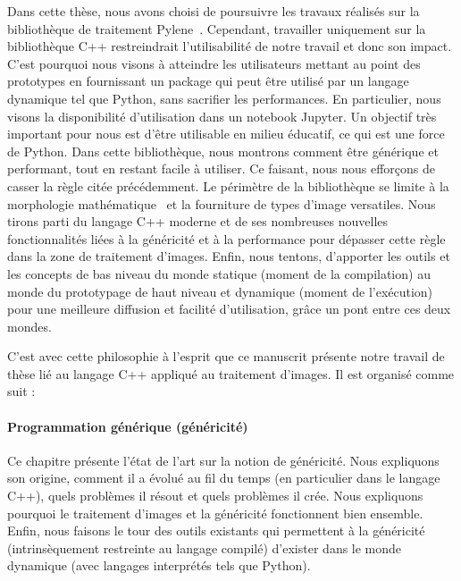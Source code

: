 Dans cette thèse, nous avons choisi de poursuivre les travaux réalisés sur la bibliothèque de traitement
Pylene~\parencite{carlinet.2018.pylena}. Cependant, travailler uniquement sur la bibliothèque C++ restreindrait
l'utilisabilité de notre travail et donc son impact. C'est pourquoi nous visons à atteindre les utilisateurs mettant au
point des prototypes en fournissant un package qui peut être utilisé par un langage dynamique tel que Python, sans
sacrifier les performances. En particulier, nous visons la disponibilité d'utilisation dans un notebook Jupyter. Un
objectif très important pour nous est d'être utilisable en milieu éducatif, ce qui est une force de Python. Dans cette
bibliothèque, nous montrons comment être générique et performant, tout en restant facile à utiliser. Ce faisant, nous
nous efforçons de casser la règle citée précédemment. Le périmètre de la bibliothèque se limite à la morphologie
mathématique~\parencite{najman.2013.mathematical,geraud.2010.book} et la fourniture de types d'image versatiles. Nous
tirons parti du langage C++ moderne et de ses nombreuses nouvelles fonctionnalités liées à la généricité et à la
performance pour dépasser cette règle dans la zone de traitement d'images. Enfin, nous tentons, d'apporter les outils et
les concepts de bas niveau du monde statique (moment de la compilation) au monde du prototypage de haut niveau et
dynamique (moment de l'exécution) pour une meilleure diffusion et facilité d'utilisation, grâce un pont entre ces deux
mondes.

C'est avec cette philosophie à l'esprit que ce manuscrit présente notre travail de thèse lié au langage C++ appliqué au
traitement d'images. Il est organisé comme suit :

\paragraph{Programmation générique (généricité)} Ce chapitre présente l'état de l'art sur la notion de généricité. Nous
expliquons son origine, comment il a évolué au fil du temps (en particulier dans le langage C++), quels problèmes il
résout et quels problèmes il crée. Nous expliquons pourquoi le traitement d'images et la généricité fonctionnent bien
ensemble. Enfin, nous faisons le tour des outils existants qui permettent à la généricité (intrinsèquement restreinte au
langage compilé) d'exister dans le monde dynamique (avec langages interprétés tels que Python).


